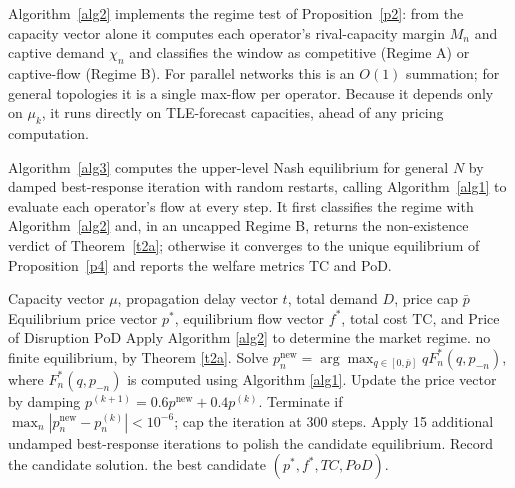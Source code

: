 \documentclass[review,3p,authoryear]{elsarticle}
\begin{document}
Algorithm~\ref{alg2} implements the regime test of Proposition~\ref{p2}: from the capacity vector alone it computes each operator's rival-capacity margin $M_{n}$ and captive demand ${\chi}_{n}$ and classifies the window as competitive (Regime A) or captive-flow (Regime B). For parallel networks this is an $O(1)$ summation; for general topologies it is a single max-flow per operator. Because it depends only on ${\mu}_{k}$, it runs directly on TLE-forecast capacities, ahead of any pricing computation.

Algorithm~\ref{alg3} computes the upper-level Nash equilibrium for general $N$ by damped best-response iteration with random restarts, calling Algorithm~\ref{alg1} to evaluate each operator's flow at every step. It first classifies the regime with Algorithm~\ref{alg2} and, in an uncapped Regime B, returns the non-existence verdict of Theorem~\ref{t2a}; otherwise it converges to the unique equilibrium of Proposition~\ref{p4} and reports the welfare metrics TC and PoD.

\begin{algorithm}[!h]
\caption{Nash Equilibrium Solver for General $N$}
\label{alg3}
\begin{algorithmic}[1]
\Require Capacity vector ${\mu}$, propagation delay vector $t$, total demand $D$, price cap $\bar{p}$
\Ensure Equilibrium price vector $p^{*}$, equilibrium flow vector $f^{*}$, total cost $\mathrm{TC}$, and Price of Disruption $\mathrm{PoD}$
\State Apply Algorithm \ref{alg2} to determine the market regime.
    \State \Return no finite equilibrium, by Theorem \ref{t2a}.
\EndIf
{}
        \State Solve $p_{n}^{\mathrm{new}} = \arg\max_{q {\in} [0,\bar{p}]} q F_{n}^{*}(q,p_{-n})$, where $F_{n}^{*}(q,p_{-n})$ is computed using Algorithm \ref{alg1}.
    \EndFor
    \State Update the price vector by damping $p^{\left(k + 1\right)} = 0.6 p^{\mathrm{new}} + 0.4 p^{\left(k\right)}$.
    \State Terminate if $\max_{n} \left| p_{n}^{\mathrm{new}} - p_{n}^{\left(k\right)} \right| < 10^{-6}$; cap the iteration at 300 steps.
    \State Apply 15 additional undamped best-response iterations to polish the candidate equilibrium.
        \State Record the candidate solution.
    \EndIf
\EndFor
\State \Return the best candidate $(p^{*},f^{*},TC,PoD)$.
\end{algorithmic}
\end{algorithm}
\FloatBarrier
\end{document}
